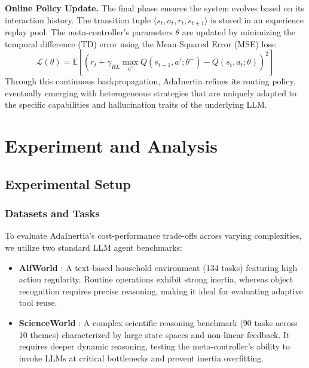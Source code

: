 \documentclass[runningheads]{llncs}
\begin{document}
\textbf{Online Policy Update.} The final phase ensures the system evolves based on its interaction history. The transition tuple $\langle s_t, a_t, r_t, s_{t+1} \rangle$ is stored in an experience replay pool. The meta-controller's parameters $\theta$ are updated by minimizing the temporal difference (TD) error using the Mean Squared Error (MSE) loss:
\begin{equation}
\mathcal{L}(\theta) = \mathbb{E} \left[ \left( r_t + \gamma_{RL} \max_{a'} Q(s_{t+1}, a'; \theta^-) - Q(s_t, a_t; \theta) \right)^2 \right]
\end{equation}
Through this continuous backpropagation, AdaInertia refines its routing policy, eventually emerging with heterogeneous strategies that are uniquely adapted to the specific capabilities and hallucination traits of the underlying LLM.

\section{Experiment and Analysis}
\subsection{Experimental Setup}
\subsubsection{Datasets and Tasks}
To evaluate AdaInertia's cost-performance trade-offs across varying complexities, we utilize two standard LLM agent benchmarks:
\begin{itemize}
    \item \textbf{AlfWorld} \cite{alfworld}: A text-based household environment (134 tasks) featuring high action regularity. Routine operations exhibit strong inertia, whereas object recognition requires precise reasoning, making it ideal for evaluating adaptive tool reuse.
    \item \textbf{ScienceWorld} \cite{scienceworld}: A complex scientific reasoning benchmark (90 tasks across 10 themes) characterized by large state spaces and non-linear feedback. It requires deeper dynamic reasoning, testing the meta-controller's ability to invoke LLMs at critical bottlenecks and prevent inertia overfitting.
\end{itemize}
\end{document}
